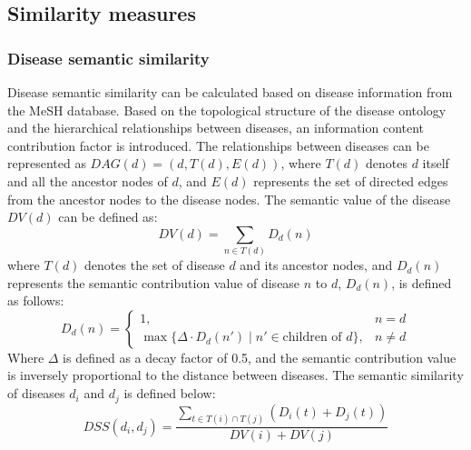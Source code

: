 \documentclass[a4paper,fleqn]{cas-dc}
\begin{document}
\subsection{Similarity measures}
\subsubsection{Disease semantic similarity}
Disease semantic similarity \cite{wang2010inferring} can be calculated based on disease information from the MeSH database. Based on the topological structure of the disease ontology and the hierarchical relationships between diseases, an information content contribution factor is introduced. The relationships between diseases can be represented as \(DAG(d) = (d, T(d), E(d))\), where \( T(d) \) denotes \( d \) itself and all the ancestor nodes of \( d \), and \( E(d) \) represents the set of directed edges from the ancestor nodes to the disease nodes. The semantic value of the disease \( DV(d) \) can be defined as:
\begin{equation}
DV(d) = \sum_{n \in T(d)} D_d(n)
\end{equation}
where \(T(d)\) denotes the set of disease \(d\) and its ancestor nodes, and \( D_d(n)\) represents the semantic contribution value of disease \(n\) to \(d\), \( D_d(n) \), is defined as follows:\\
\begin{equation}
	D_{d}(n) = 
	\begin{cases}
		1, & n = d \\
		\max\bigl\{\Delta \cdot D_{d}(n') \mid n' \in \text{children of } d\bigr\}, & n \neq d
	\end{cases}
\end{equation}
Where \(\Delta\) is defined as a decay factor of 0.5, and the semantic contribution value is inversely proportional to the distance between diseases. The semantic similarity of diseases $d_i$ and $d_j$ is defined below:
\begin{equation}
	DSS(d_i, d_j) = \frac{\sum_{t \in T(i) \cap T(j)} \left(D_i(t) + D_j(t)\right)}{DV(i) + DV(j)}
\end{equation}
\end{document}

